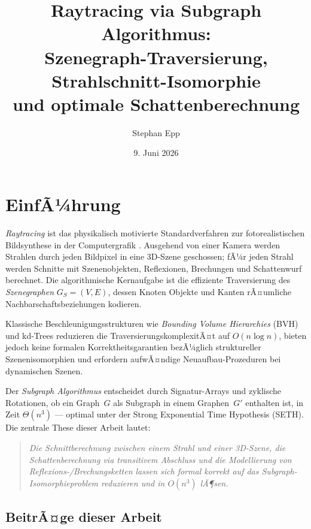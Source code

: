 ﻿\documentclass[a4paper,12pt]{article}
\title{\textbf{Raytracing via Subgraph Algorithmus:\\
Szenegraph-Traversierung, Strahlschnitt-Isomorphie\\
und optimale Schattenberechnung}}
\author{Stephan Epp}
\date{9. Juni 2026}
\theoremstyle{definition}
\begin{document}
\maketitle
\tableofcontents
\newpage

\section{EinfÃ¼hrung}

\emph{Raytracing} ist das physikalisch motivierte Standardverfahren zur
fotorealistischen Bildsynthese in der Computergrafik \citep{Whitted1980}.
Ausgehend von einer Kamera werden Strahlen durch jeden Bildpixel in eine
3D-Szene geschossen; fÃ¼r jeden Strahl werden Schnitte mit Szenenobjekten,
Reflexionen, Brechungen und Schattenwurf berechnet. Die algorithmische
Kernaufgabe ist die effiziente Traversierung des \emph{Szenegraphen}
$G_S = (V, E)$, dessen Knoten Objekte und Kanten rÃ¤umliche
Nachbarschaftsbeziehungen kodieren.

Klassische Beschleunigungsstrukturen wie \emph{Bounding Volume
Hierarchies} (BVH) \citep{Rubin1980} und kd-Trees \citep{Bentley1975}
reduzieren die TraversierungskomplexitÃ¤t auf $O(n \log n)$, bieten
jedoch keine formalen Korrektheitsgarantien bezÃ¼glich struktureller
Szenenisomorphien und erfordern aufwÃ¤ndige Neuaufbau-Prozeduren bei
dynamischen Szenen.

Der \emph{Subgraph Algorithmus} \citep{Epp2026} entscheidet durch
Signatur-Arrays und zyklische Rotationen, ob ein Graph~$G$ als Subgraph
in einem Graphen~$G'$ enthalten ist, in Zeit $\Theta(n^3)$ --- optimal
unter der Strong Exponential Time Hypothesis (SETH). Die zentrale These
dieser Arbeit lautet:

\begin{quote}
  \emph{Die Schnittberechnung zwischen einem Strahl und einer 3D-Szene,
  die Schattenberechnung via transitivem Abschluss und die Modellierung
  von Reflexions-/Brechungsketten lassen sich formal korrekt auf das
  Subgraph-Isomorphieproblem reduzieren und in $O(n^3)$ lÃ¶sen.}
\end{quote}

\subsection{BeitrÃ¤ge dieser Arbeit}
\end{document}
